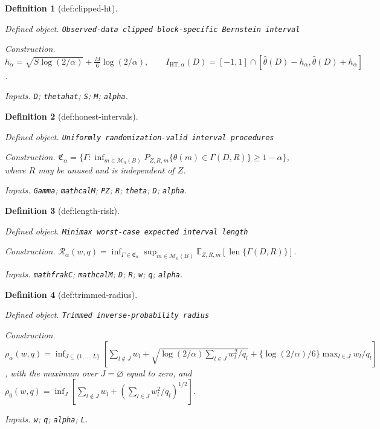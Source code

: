 \documentclass{article}
\newtheorem{definition}{Definition}
\begin{document}
\begin{definition}[def:clipped-ht]\label{def:clipped-ht}
\par\smallskip\noindent\emph{Defined object.} \texttt{Observed-\allowbreak{}data clipped block-\allowbreak{}specific Bernstein interval}
\par\smallskip\noindent\emph{Construction.} \(h_\alpha=\sqrt{S\log(2/\alpha)}+\frac{M}{6}\log(2/\alpha),\qquad I_{\mathrm{HT},\alpha}(D)=[-1,1]\cap[\widehat\theta(D)-h_\alpha,\widehat\theta(D)+h_\alpha]\).
\par\smallskip\noindent\emph{Inputs.} \texttt{D}; \texttt{thetahat}; \texttt{S}; \texttt{M}; \texttt{alpha}.
\end{definition}

\begin{definition}[def:honest-intervals]\label{def:honest-intervals}
\par\smallskip\noindent\emph{Defined object.} \texttt{Uniformly randomization-\allowbreak{}valid interval procedures}
\par\smallskip\noindent\emph{Construction.} \(\mathfrak C_\alpha=\{\Gamma:\inf_{m\in\mathcal M_n(B)}P_{Z,R,m}\{\theta(m)\in\Gamma(D,R)\}\ge1-\alpha\}\), where \(R\) may be unused and is independent of \(Z\).
\par\smallskip\noindent\emph{Inputs.} \texttt{Gamma}; \texttt{mathcalM}; \texttt{PZ}; \texttt{R}; \texttt{theta}; \texttt{D}; \texttt{alpha}.
\end{definition}

\begin{definition}[def:length-risk]\label{def:length-risk}
\par\smallskip\noindent\emph{Defined object.} \texttt{Minimax worst-\allowbreak{}case expected interval length}
\par\smallskip\noindent\emph{Construction.} \(\mathcal R_\alpha(w,q)=\inf_{\Gamma\in\mathfrak C_\alpha}\sup_{m\in\mathcal M_n(B)}\mathbb E_{Z,R,m}[\operatorname{len}\{\Gamma(D,R)\}]\).
\par\smallskip\noindent\emph{Inputs.} \texttt{mathfrakC}; \texttt{mathcalM}; \texttt{D}; \texttt{R}; \texttt{w}; \texttt{q}; \texttt{alpha}.
\end{definition}

\begin{definition}[def:trimmed-radius]\label{def:trimmed-radius}
\par\smallskip\noindent\emph{Defined object.} \texttt{Trimmed inverse-\allowbreak{}probability radius}
\par\smallskip\noindent\emph{Construction.} \(\rho_\alpha(w,q)=\inf_{J\subseteq\{1,\ldots,L\}}[\sum_{l\notin J}w_l+\sqrt{\log(2/\alpha)\sum_{l\in J}w_l^2/q_l}+\{\log(2/\alpha)/6\}\max_{l\in J}w_l/q_l]\), with the maximum over \(J=\varnothing\) equal to zero, and \(\rho_0(w,q)=\inf_J[\sum_{l\notin J}w_l+(\sum_{l\in J}w_l^2/q_l)^{1/2}]\).
\par\smallskip\noindent\emph{Inputs.} \texttt{w}; \texttt{q}; \texttt{alpha}; \texttt{L}.
\end{definition}
\end{document}
